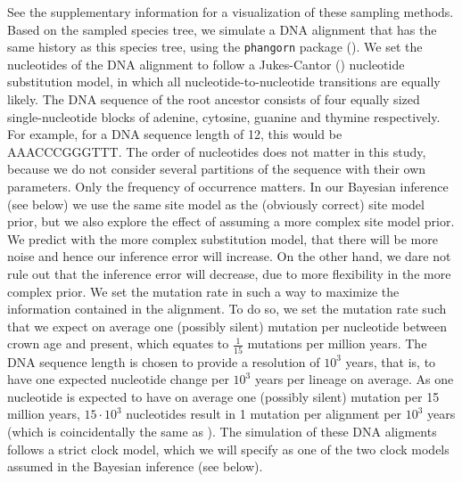 See the supplementary information for a visualization of these sampling methods.
Based on the sampled species tree, we simulate a DNA alignment that has the same history
as this species tree, using the \verb;phangorn; package (\cite{phangorn}). 
We set the nucleotides of the DNA alignment to follow a Jukes-Cantor (\cite{jc69})
nucleotide substitution model, in which all nucleotide-to-nucleotide transitions
are equally likely. 
The DNA sequence of the root ancestor consists of four equally sized single-nucleotide blocks of adenine, cytosine, guanine and thymine respectively. 
For example, for a DNA sequence length of 12, this would be AAACCCGGGTTT. 
The order of nucleotides does not matter in this study, 
because we do not consider several partitions of the sequence with their own parameters. 
Only the frequency of occurrence matters.
In our Bayesian inference (see below) we use the same site model as the (obviously correct) site model prior,
but we also explore the effect of assuming a more complex site model prior.
We predict with the more complex substitution model, 
that there will be more noise and hence our inference error will increase.
On the other hand, we dare not rule out that the inference error will decrease,
due to more flexibility in the more complex prior.
We set the mutation rate in such a way to maximize the information contained in the alignment.
To do so, we set the mutation rate such that we expect on average one (possibly silent) mutation per nucleotide
between crown age and present, which equates to $\frac{1}{15}$ mutations
per million years.
The DNA sequence length is chosen to provide a
resolution of $10^3$ years, 
that is, to have one expected nucleotide change 
per $10^3$ years per lineage on average. As one nucleotide is expected 
to have on average one (possibly silent) mutation per 15 million years, $15 \cdot 10^3$
nucleotides result in 1 mutation per alignment per $10^3$ years (which is
coincidentally the same as \cite{moller2018}). 
The simulation of these DNA aligments follows a strict clock model, 
which we will specify as one of the two clock models assumed in the Bayesian inference (see below).

